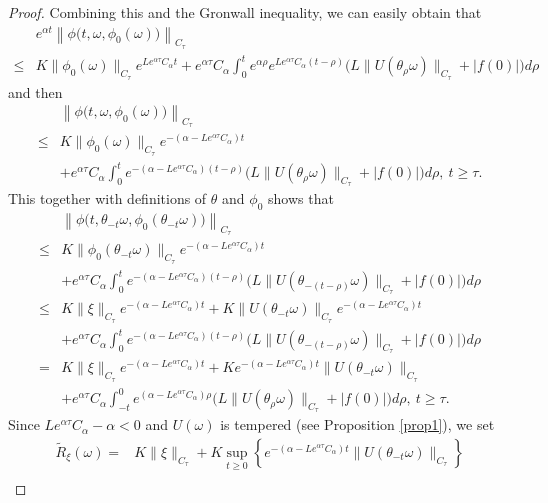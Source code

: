 \documentclass[preprint,12pt]{elsarticle}
\begin{document}
\begin{proof}
Combining this and the Gronwall inequality, we can easily obtain that
\begin{align}\label{eq31}
&e^{\alpha t}\left\|\phi\bigl(t,\omega,\phi_0(\omega)\bigr)\right\|_{C_\tau}\nonumber\\
\leq&K\|\phi_0(\omega)\|_{C_\tau}e^{Le^{\alpha\tau}C_\alpha t}+e^{\alpha\tau}C_\alpha\int_0^{t}e^{\alpha\rho}e^{Le^{\alpha\tau}C_\alpha (t-\rho)}\bigl(L\|U(\theta_{\rho}\omega)\|_{C_\tau}+|f(0)|\bigr)d\rho
\end{align}
and then
\begin{align}\label{eq32}
&\left\|\phi\bigl(t,\omega,\phi_0(\omega)\bigr)\right\|_{C_\tau}\nonumber\\
\leq&K\|\phi_0(\omega)\|_{C_\tau}e^{-(\alpha-Le^{\alpha\tau}C_\alpha)t}\nonumber\\
&+e^{\alpha\tau}C_\alpha\int_0^{t}e^{-(\alpha-Le^{\alpha\tau}C_\alpha) (t-\rho)}\bigl(L\|U(\theta_{\rho}\omega)\|_{C_\tau}+|f(0)|\bigr)d\rho,\ t\geq\tau.
\end{align}
This together with definitions of $\theta$ and $\phi_0$ shows that
\begin{align}\label{eq32-1}
&\left\|\phi\bigl(t,\theta_{-t}\omega,\phi_0(\theta_{-t}\omega)\bigr)\right\|_{C_\tau}\nonumber\\
\leq&K\|\phi_0(\theta_{-t}\omega)\|_{C_\tau}e^{-(\alpha-Le^{\alpha\tau}C_\alpha)t}\nonumber\\
&+e^{\alpha\tau}C_\alpha\int_0^{t}e^{-(\alpha-Le^{\alpha\tau}C_\alpha) (t-\rho)}\bigl(L\|U(\theta_{-(t-\rho)}\omega)\|_{C_\tau}+|f(0)|\bigr)d\rho\nonumber\\
\leq&K\|\xi\|_{C_\tau}e^{-(\alpha-Le^{\alpha\tau}C_\alpha)t}+K\|U(\theta_{-t}\omega)\|_{C_\tau}e^{-(\alpha-Le^{\alpha\tau}C_\alpha)t}\nonumber\\
&+e^{\alpha\tau}C_\alpha\int_0^{t}e^{-(\alpha-Le^{\alpha\tau}C_\alpha) (t-\rho)}\bigl(L\|U(\theta_{-(t-\rho)}\omega)\|_{C_\tau}+|f(0)|\bigr)d\rho\nonumber\\
=&K\|\xi\|_{C_\tau}e^{-(\alpha-Le^{\alpha\tau}C_\alpha)t}+Ke^{-(\alpha-Le^{\alpha\tau}C_\alpha)t}\|U(\theta_{-t}\omega)\|_{C_\tau}\nonumber\\
&+e^{\alpha\tau}C_\alpha\int_{-t}^0e^{(\alpha-Le^{\alpha\tau}C_\alpha)\rho}\bigl(L\|U(\theta_{\rho}\omega)\|_{C_\tau}+|f(0)|\bigr)d\rho,\ t\geq\tau.
\end{align}
Since $Le^{\alpha\tau}C_\alpha-\alpha<0$ and $U(\omega)$ is tempered (see Proposition \ref{prop1}), we set
\begin{align}\label{eq33}
\widetilde{R}_\xi(\omega)=&K\|\xi\|_{C_\tau}+K\sup_{t\geq0}\left\{e^{-(\alpha-Le^{\alpha\tau}C_\alpha)t}\|U(\theta_{-t}\omega)\|_{C_\tau}\right\}\nonumber\\

\end{align}
\end{proof}
\end{document}
